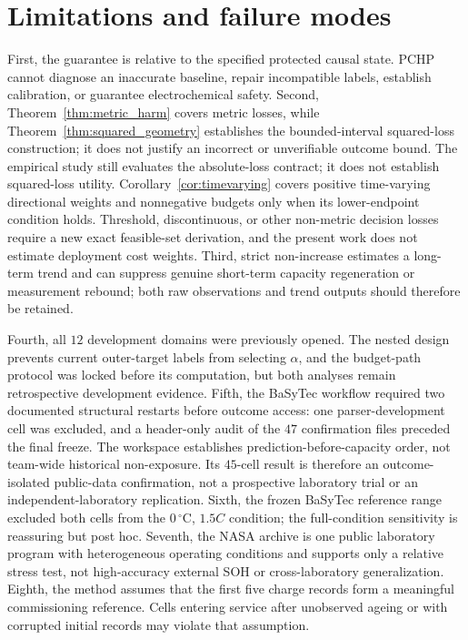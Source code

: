 \documentclass[11pt]{article}
\begin{document}
\section{Limitations and failure modes}

First, the guarantee is relative to the specified protected causal state. PCHP cannot diagnose an inaccurate baseline, repair incompatible labels, establish calibration, or guarantee electrochemical safety. Second, Theorem~\ref{thm:metric_harm} covers metric losses, while Theorem~\ref{thm:squared_geometry} establishes the bounded-interval squared-loss construction; it does not justify an incorrect or unverifiable outcome bound. The empirical study still evaluates the absolute-loss contract; it does not establish squared-loss utility. Corollary~\ref{cor:timevarying} covers positive time-varying directional weights and nonnegative budgets only when its lower-endpoint condition holds. Threshold, discontinuous, or other non-metric decision losses require a new exact feasible-set derivation, and the present work does not estimate deployment cost weights. Third, strict non-increase estimates a long-term trend and can suppress genuine short-term capacity regeneration or measurement rebound; both raw observations and trend outputs should therefore be retained.

Fourth, all $12$ development domains were previously opened. The nested design prevents current outer-target labels from selecting $\alpha$, and the budget-path protocol was locked before its computation, but both analyses remain retrospective development evidence. Fifth, the BaSyTec workflow required two documented structural restarts before outcome access: one parser-development cell was excluded, and a header-only audit of the $47$ confirmation files preceded the final freeze. The workspace establishes prediction-before-capacity order, not team-wide historical non-exposure. Its $45$-cell result is therefore an outcome-isolated public-data confirmation, not a prospective laboratory trial or an independent-laboratory replication. Sixth, the frozen BaSyTec reference range excluded both cells from the $0\,^{\circ}\mathrm{C}$, $1.5C$ condition; the full-condition sensitivity is reassuring but post hoc. Seventh, the NASA archive is one public laboratory program with heterogeneous operating conditions and supports only a relative stress test, not high-accuracy external SOH or cross-laboratory generalization. Eighth, the method assumes that the first five charge records form a meaningful commissioning reference. Cells entering service after unobserved ageing or with corrupted initial records may violate that assumption.
\end{document}
